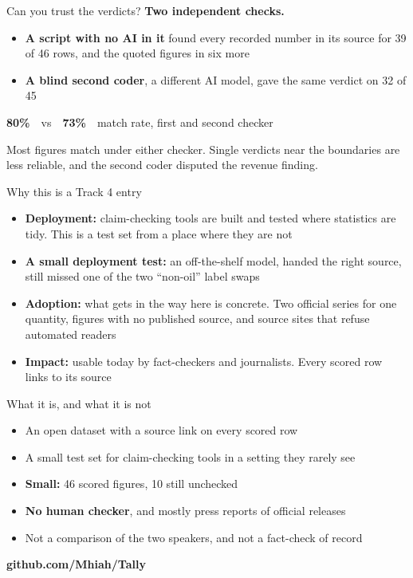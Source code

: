 \documentclass[aspectratio=169,12pt]{beamer}
\newcommand{\bignum}[1]{{\fontsize{30}{34}\selectfont\bfseries\color{accent}#1}}
\newcommand{\sm}[1]{{\small\color{muted}#1}}
\begin{document}
\begin{frame}{Can you trust the verdicts?}
\textbf{Two independent checks.}
\vspace{0.1cm}
\begin{itemize}\setlength{\itemsep}{8pt}
\item \textbf{A script with no AI in it} found every recorded number in its source for 39 of 46 rows, and the quoted figures in six more
\item \textbf{A blind second coder}, a different AI model, gave the same verdict on 32 of 45
\end{itemize}
\vspace{0.2cm}
\bignum{80\%}\ \ vs\ \ \bignum{73\%}\ \ \sm{match rate, first and second checker}

\sm{Most figures match under either checker. Single verdicts near the boundaries are less reliable, and the second coder disputed the revenue finding.}
\end{frame}

\begin{frame}{Why this is a Track 4 entry}
\begin{itemize}\setlength{\itemsep}{9pt}
\item \textbf{Deployment:} claim-checking tools are built and tested where statistics are tidy. This is a test set from a place where they are not
\item \textbf{A small deployment test:} an off-the-shelf model, handed the right source, still missed one of the two ``non-oil'' label swaps
\item \textbf{Adoption:} what gets in the way here is concrete. Two official series for one quantity, figures with no published source, and source sites that refuse automated readers
\item \textbf{Impact:} usable today by fact-checkers and journalists. Every scored row links to its source
\end{itemize}
\end{frame}

\begin{frame}{What it is, and what it is not}
\begin{itemize}\setlength{\itemsep}{8pt}
\item An open dataset with a source link on every scored row
\item A small test set for claim-checking tools in a setting they rarely see
\item \textbf{Small:} 46 scored figures, 10 still unchecked
\item \textbf{No human checker}, and mostly press reports of official releases
\item Not a comparison of the two speakers, and not a fact-check of record
\end{itemize}
\vspace{0.3cm}
{\bfseries\color{accent}github.com/Mhiah/Tally}
\end{frame}
\end{document}
